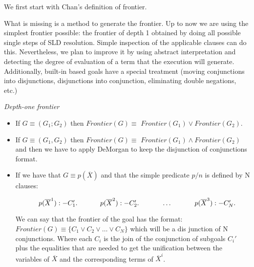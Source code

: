 \documentclass{llncs}
\begin{document}
We first start with Chan's definition of frontier.

\begin{definition}
\end{definition}


What is missing is a method to generate the frontier.  Up to now we
are using the simplest frontier possible: the frontier of depth 1
obtained by doing all possible single steps of SLD resolution. Simple
inspection of the applicable clauses can do this.  Nevertheless, we
plan to improve it by using abstract interpretation and
detecting the degree of evaluation of a term that the execution will
generate.
Additionally, built-in based goals have a special
treatment (moving conjunctions into disjunctions, disjunctions into
conjunction, eliminating double negations, etc.)

\begin{definition}{\em Depth-one frontier}

    \begin{itemize} 

\item If $G \equiv (G_1;G_2) $ then $Frontier(G) \equiv$
$Frontier(G_1) \vee Frontier(G_2)$.

    \item If $G \equiv (G_1,G_2) $ then $Frontier(G) \equiv$
$Frontier(G_1) \wedge Frontier(G_2)$ and then we have to apply
DeMorgan to keep the disjunction of conjunctions format.

    \item If we have that $G \equiv p( \overline{X}) $ and that the simple
predicate $p/n$ is defined by N clauses:

$
~~~~~~~~~~p( \overline{X}^1):- C_1'. \\
~~~~~~~~~~p( \overline{X}^2):- C_2'. \\
~~~~~~~~~~\ldots \\
~~~~~~~~~~p( \overline{X}^3):- C_N'. \\
$

We can say that the frontier of the goal has the format:
$Frontier(G) \equiv \{C_1 \vee C_2 \vee \ldots \vee C_N\}$ which
will be a dis junction of N conjunctions. Where each $C_i$ is the join
of the conjunction of subgoals $C_i'$ plus the equalities that are
needed to get the unification between the variables of $\overline{X}$
and the corresponding terms of $\overline{X}^i$.

    \end{itemize}

\end{definition}
\end{document}
